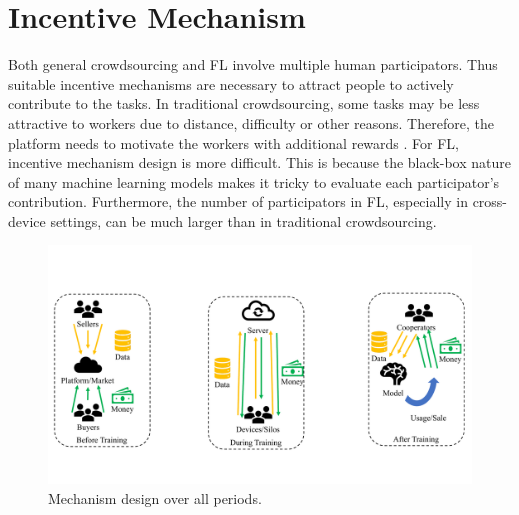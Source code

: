 \documentclass[11pt]{article}
\begin{document}
\section{Incentive Mechanism}
\label{sec:IncentiveMechanismDesign}
Both general crowdsourcing and FL involve multiple human participators. 
Thus suitable incentive mechanisms are necessary to attract people to actively contribute to the tasks.
In traditional crowdsourcing, some tasks may be less attractive to workers due to distance, difficulty or other reasons.
Therefore, the platform needs to motivate the workers with additional rewards \cite{DBLP:conf/sigmod/TongWZCDY18}. 
For FL, incentive mechanism design is more difficult. 
This is because the black-box nature of many machine learning models makes it tricky to evaluate each participator's contribution. 
Furthermore, the number of participators in FL, especially in cross-device settings, can be much larger than in traditional crowdsourcing.

\begin{figure}
\centering
\includegraphics[scale=0.4]{submissions/yongxin/figs/mechanism.pdf}
\caption{Mechanism design over all periods.}
\label{fig:mechanism}
\end{figure}
\end{document}
